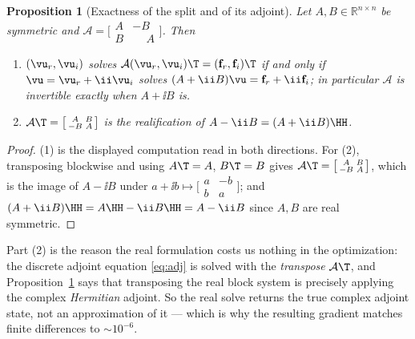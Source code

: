\documentclass[11pt]{article}
\newtheorem{proposition}{Proposition}
\begin{document}
\begin{proposition}[Exactness of the split and of its adjoint]
\label{prop:split}
Let $A,B\in\mathbb R^{n\times n}$ be symmetric and
$\mathcal A=\bigl[\begin{smallmatrix}A&-B\\ B&\phantom{-}A\end{smallmatrix}\bigr]$.
Then
\begin{enumerate}\itemsep0pt
\item $(\vu_r,\vu_i)$ solves $\mathcal A(\vu_r,\vu_i)\T=(\mathbf f_r,\mathbf f_i)\T$
if and only if $\vu=\vu_r+\ii\vu_i$ solves $(A+\ii B)\vu=\mathbf f_r+\ii\mathbf f_i$;
in particular $\mathcal A$ is invertible exactly when $A+\ii B$ is.
\item $\mathcal A\T=\bigl[\begin{smallmatrix}A&B\\ -B&A\end{smallmatrix}\bigr]$
is the realification of $A-\ii B=(A+\ii B)\HH$.
\end{enumerate}
\end{proposition}
\begin{proof}
(1) is the displayed computation read in both directions. For (2), transposing
blockwise and using $A\T=A$, $B\T=B$ gives
$\mathcal A\T=\bigl[\begin{smallmatrix}A&B\\ -B&A\end{smallmatrix}\bigr]$, which
is the image of $A-\ii B$ under
$a+\ii b\mapsto\bigl[\begin{smallmatrix}a&-b\\ b&a\end{smallmatrix}\bigr]$; and
$(A+\ii B)\HH=A\HH-\ii B\HH=A-\ii B$ since $A,B$ are real symmetric.
\end{proof}

Part (2) is the reason the real formulation costs us nothing in the optimization:
the discrete adjoint equation \eqref{eq:adj} is solved with the \emph{transpose}
$\mathcal A\T$, and Proposition~\ref{prop:split} says that transposing the real
block system is precisely applying the complex \emph{Hermitian} adjoint. So the
real solve returns the true complex adjoint state, not an approximation of it ---
which is why the resulting gradient matches finite differences to
$\sim\!10^{-6}$.
\end{document}
